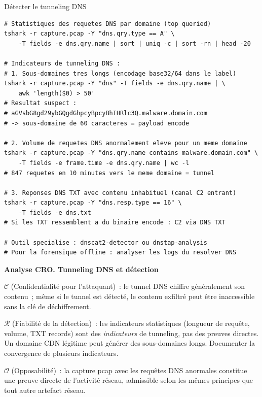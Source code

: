 \begin{boxoutils}{Détecter le tunneling DNS}
\begin{lstlisting}[language=bash_forensique]
# Statistiques des requetes DNS par domaine (top queried)
tshark -r capture.pcap -Y "dns.qry.type == A" \
    -T fields -e dns.qry.name | sort | uniq -c | sort -rn | head -20

# Indicateurs de tunneling DNS :
# 1. Sous-domaines tres longs (encodage base32/64 dans le label)
tshark -r capture.pcap -Y "dns" -T fields -e dns.qry.name | \
    awk 'length($0) > 50'
# Resultat suspect :
# aGVsbG8gd29ybGQgdGhpcyBpcyBhIHRlc3Q.malware.domain.com
# -> sous-domaine de 60 caracteres = payload encode

# 2. Volume de requetes DNS anormalement eleve pour un meme domaine
tshark -r capture.pcap -Y "dns.qry.name contains malware.domain.com" \
    -T fields -e frame.time -e dns.qry.name | wc -l
# 847 requetes en 10 minutes vers le meme domaine = tunnel

# 3. Reponses DNS TXT avec contenu inhabituel (canal C2 entrant)
tshark -r capture.pcap -Y "dns.resp.type == 16" \
    -T fields -e dns.txt
# Si les TXT ressemblent a du binaire encode : C2 via DNS TXT

# Outil specialise : dnscat2-detector ou dnstap-analysis
# Pour la forensique offline : analyser les logs du resolver DNS
\end{lstlisting}
\end{boxoutils}

\begin{boxCRO}
\textbf{Analyse CRO. Tunneling DNS et détection}

$\mathcal{C}$ (Confidentialité pour l'attaquant)~: le tunnel DNS chiffre
généralement son contenu~; même si le tunnel est détecté, le contenu
exfiltré peut être inaccessible sans la clé de déchiffrement.

$\mathcal{R}$ (Fiabilité de la détection)~: les indicateurs
statistiques (longueur de requête, volume, TXT records) sont des
\emph{indicateurs} de tunneling, pas des preuves directes. Un domaine
CDN légitime peut générer des sous-domaines longs. Documenter la
convergence de plusieurs indicateurs.

$\mathcal{O}$ (Opposabilité)~: la capture pcap avec les requêtes DNS
anormales constitue une preuve directe de l'activité réseau, admissible
selon les mêmes principes que tout autre artefact réseau.

\end{boxCRO}


